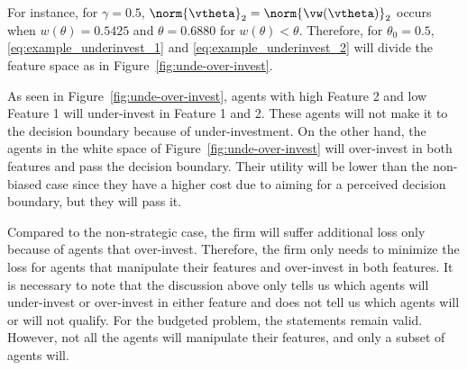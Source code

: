 For instance, for $\gamma = 0.5$, $\norm{\vtheta}_2=\norm{\vw(\vtheta)}_2$ occurs when $w(\theta) = 0.5425$ and $\theta = 0.6880$ for $w(\theta)<\theta$. Therefore, for $\theta_0 = 0.5$, \eqref{eq:example_underinvest_1} and \eqref{eq:example_underinvest_2} will divide the feature space as in Figure~\ref{fig:unde-over-invest}. 
 
As seen in Figure~\ref{fig:unde-over-invest}, agents with high Feature 2 and low Feature 1 will under-invest in Feature 1 and 2. These agents will not make it to the decision boundary because of under-investment. On the other hand, the agents in the white space of Figure~\ref{fig:unde-over-invest} will over-invest in both features and pass the decision boundary. Their utility will be lower than the non-biased case since they have a higher cost due to aiming for a perceived decision boundary, but they will pass it. 
 
Compared to the non-strategic case, the firm will suffer additional loss only because of agents that over-invest. Therefore, the firm only needs to minimize the loss for agents that manipulate their features and over-invest in both features. It is necessary to note that the discussion above only tells us which agents will under-invest or over-invest in either feature and does not tell us which agents will or will not qualify. For the budgeted problem, the statements remain valid. However, not all the agents will manipulate their features, and only a subset of agents will. 

